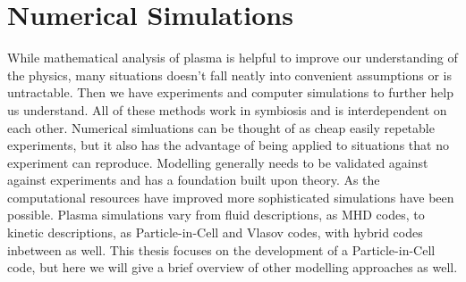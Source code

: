 \section{Numerical Simulations}

	While mathematical analysis of plasma is helpful to improve our
	understanding of the physics, many situations doesn't fall neatly into convenient
	assumptions or is untractable. Then we have experiments and computer simulations
	to further help us understand. All of these methods work in symbiosis and is interdependent
	on each other. Numerical simluations can be thought of as cheap easily repetable
	experiments, but it also has the advantage of being applied to situations that no
	experiment can reproduce. Modelling generally needs to be validated against
	against experiments and has a foundation built upon theory. As the computational
	resources have improved more  sophisticated simulations have been possible.
	Plasma simulations vary from fluid descriptions, as MHD codes, to kinetic descriptions,
	as Particle-in-Cell and Vlasov codes, with hybrid codes inbetween as well.
	This thesis focuses on the development of a Particle-in-Cell code, but here we will give a brief
	overview of other modelling approaches as well.

